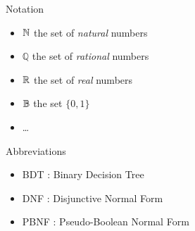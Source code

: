 
Notation
\begin{itemize}
   \item $\mathbb{N}$ the set of \emph{natural} numbers
   \item $\mathbb{Q}$ the set of \emph{rational} numbers
   \item $\mathbb{R}$ the set of \emph{real} numbers
   \item $\mathbb{B}$ the set $\{0,1\}$
   \item \dots
\end{itemize}


\ni Abbreviations
\begin{itemize}
   \item BDT : Binary Decision Tree
   \item DNF : Disjunctive Normal Form
   \item PBNF : Pseudo-Boolean Normal Form
\end{itemize}
